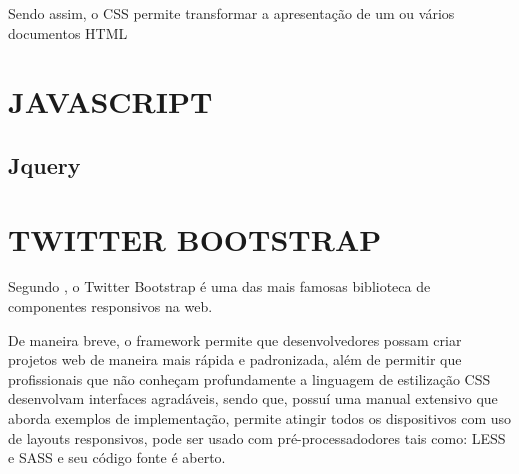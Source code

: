 Sendo assim, o \acs{CSS} permite transformar a apresentação de um ou vários
documentos \acs{HTML}

\section{JAVASCRIPT}
\subsection{Jquery}
\section{TWITTER BOOTSTRAP}

Segundo \cite{jumpStartResponsiveWebDesign}, o \acs{Twitter Bootstrap}  é uma
das mais famosas biblioteca de componentes responsivos na web.

De maneira breve, o framework permite que desenvolvedores possam criar
projetos web de maneira mais rápida e padronizada, além de permitir que
profissionais que não conheçam profundamente a linguagem de estilização 
\acs{CSS} desenvolvam interfaces agradáveis, sendo que, possuí uma manual 
extensivo que aborda exemplos de implementação, permite atingir todos os 
dispositivos com uso de layouts responsivos, pode ser usado com
pré-processadodores  tais como: \acs{LESS} e \acs{SASS} e seu código fonte é
aberto.
